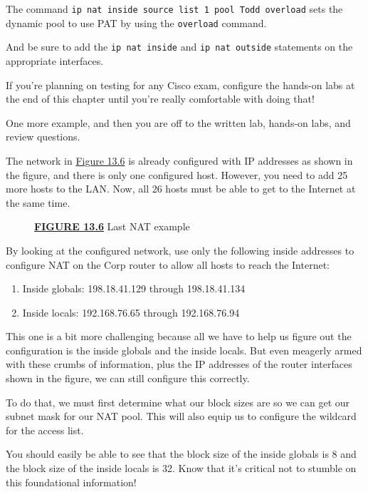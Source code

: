 The command
\texttt{ip\ nat\ inside\ source\ list\ 1\ pool\ Todd\ overload} sets the
dynamic pool to use PAT by using the \texttt{overload} command.

And be sure to add the \texttt{ip\ nat\ inside} and
\texttt{ip\ nat\ outside} statements on the appropriate interfaces.

\begin{note}
If you're planning on testing for any Cisco exam, configure the hands-on labs at the end of this chapter until you're really comfortable with doing that!
\end{note}

One more example, and then you are off to the written lab, hands-on
labs, and review questions.

The network in
\protect\hyperlink{c13.xhtmlux5cux23figure13-6}{Figure 13.6} is already
configured with IP addresses as shown in the figure, and there is only
one configured host. However, you need to add 25 more hosts to the LAN.
Now, all 26 hosts must be able to get to the Internet at the same time.

\begin{figure}
\centering
\caption{{\protect\hyperlink{c13.xhtmlux5cux23figureanchor13-6}{\textbf{FIGURE
13.6}} Last NAT example}}
\end{figure}

By looking at the configured network, use only the following inside
addresses to configure NAT on the Corp router to allow all hosts to
reach the Internet:

\begin{enumerate}
\tightlist
\item
  Inside globals: 198.18.41.129 through 198.18.41.134
\item
  Inside locals: 192.168.76.65 through 192.168.76.94
\end{enumerate}

This one is a bit more challenging because all we have to help us figure
out the configuration is the inside globals and the inside locals. But
even meagerly armed with these crumbs of information, plus the IP
addresses of the router interfaces shown in the figure, we can still
configure this correctly.

To do that, we must first determine what our block sizes are so we can
get our subnet mask for our NAT pool. This will also equip us to
configure the wildcard for the access list.

You should easily be able to see that the block size of the inside
globals is 8 and the block size of the inside locals is 32. Know that
it's critical not to stumble on this foundational information!

